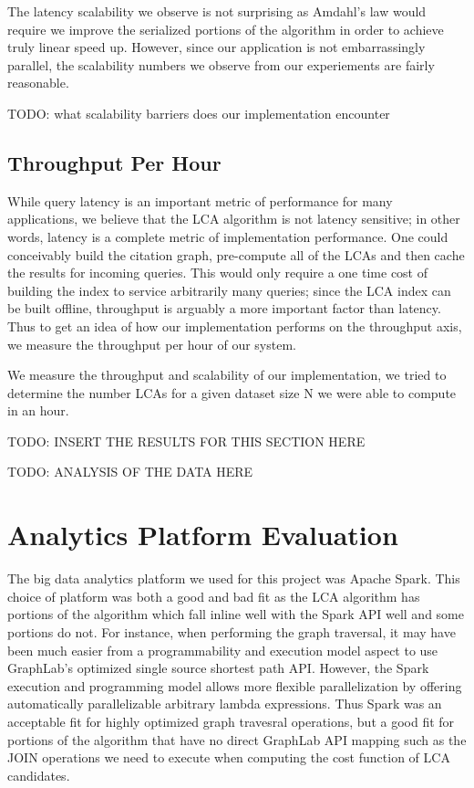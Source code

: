 \documentclass{article}
\begin{document}
The latency scalability we observe is not surprising as Amdahl's law would require we improve the serialized portions of the algorithm in order to achieve truly linear speed up.
However, since our application is not embarrassingly parallel, the scalability numbers we observe from our experiements are fairly reasonable.

TODO: what scalability barriers does our implementation encounter

\subsection{Throughput Per Hour}

While query latency is an important metric of performance for many applications, we believe that the LCA algorithm is not latency sensitive; in other words, latency is a complete metric of implementation performance.
One could conceivably build the citation graph, pre-compute all of the LCAs and then cache the results for incoming queries.
This would only require a one time cost of building the index to service arbitrarily many queries; since the LCA index can be built offline, throughput is arguably a more important factor than latency.
Thus to get an idea of how our implementation performs on the throughput axis, we measure the throughput per hour of our system.

We measure the throughput and scalability of our implementation, we tried to determine the number LCAs for a given dataset size N we were able to compute in an hour.

TODO: INSERT THE RESULTS FOR THIS SECTION HERE

TODO: ANALYSIS OF THE DATA HERE

\section{Analytics Platform Evaluation}

The big data analytics platform we used for this project was Apache Spark.
This choice of platform was both a good and bad fit as the LCA algorithm has portions of the algorithm which fall inline well with the Spark API well and some portions do not.
For instance, when performing the graph traversal, it may have been much easier from a programmability and execution model aspect to use GraphLab's optimized single source shortest path API.
However, the Spark execution and programming model allows more flexible parallelization by offering automatically parallelizable arbitrary lambda expressions.
Thus Spark was an acceptable fit for highly optimized graph travesral operations, but a good fit for portions of the algorithm that have no direct GraphLab API mapping such as the JOIN operations we need to execute when computing the cost function of LCA candidates.
\end{document}
